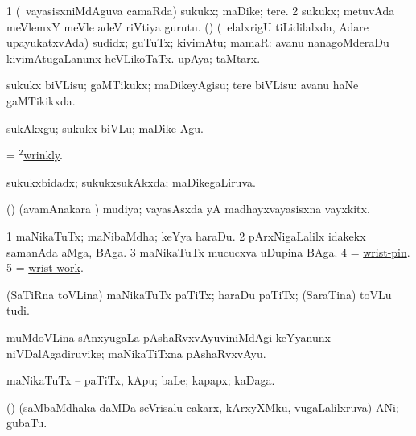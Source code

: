 \begin{center}
\bentry
{} 
\gl{\nA}
\expl{}
\bmng
\bnum
\num{1} (\sA\ vayasisxniMdAguva camaRda) sukukx; maDike; tere. 
\num{2} sukukx; metuvAda meVlemxY meVle adeV riVtiya gurutu. 
 (\AmA) 
\banum
{} (\sA\ elalxrigU tiLidilalxda, Adare upayukatxvAda) sudidx; guTuTx; kivimAtu; mamaR:  avanu nanagoMderaDu kivimAtugaLanunx heVLikoTaTx. 
 upAya; taMtarx. 
\eanum
\numie
\enum
\emng
\eentry

\bentry
{} 
\gl{\sakirx}
\expl{}
\bmng
sukukx biVLisu; gaMTikukx; maDikeyAgisu; tere biVLisu:  avanu haNe gaMTikikxda. 
\emng

\noindent
\gl{\akirx}
\expl{}
\bmng
sukAkxgu; sukukx biVLu; maDike Agu. 
\emng
\eentry

\bentry
{} 
\gl{\nA}
\expl{}
\bmng
= \hyperlink{wrinkly(2)}{$^2$wrinkly}. 
\emng
\eentry

\bentry 
{} 
\gl{\gu}
\bmng
sukukxbidadx; sukukxsukAkxda; maDikegaLiruva. 
\emng
\eentry

\bentry 
{} 
\gl{\nA}
\bmng
(\ashi) (avamAnakara \parx) mudiya; vayasAsxda yA madhayxvayasisxna vayxkitx. 
\emng
\eentry

\bentry
{} 
\gl{\nA}
\expl{}
\bmng
\bnum
\num{1} maNikaTuTx; maNibaMdha; keYya haraDu. 
\num{2} pArxNigaLalilx idakekx samanAda aMga, BAga. 
\num{3} maNikaTuTx mucucxva uDupina BAga. 
\num{4} = \hyperlink{wrist-pin}{wrist-pin}. 
\num{5} = \hyperlink{wrist-work}{wrist-work}. 
\enum
\emng
\eentry

\bentry
{} 
\gl{\nA}
\expl{}
\bmng
(SaTiRna toVLina) maNikaTuTx paTiTx; haraDu paTiTx; (SaraTina) toVLu tudi. 
\emng
\eentry

\bentry
{} 
\gl{\nA}
\expl{}
\bmng
muMdoVLina sAnxyugaLa pAshaRvxvAyuviniMdAgi keYyanunx niVDalAgadiruvike; maNikaTiTxna pAshaRvxvAyu. 
\emng
\eentry

\bentry
{} 
\gl{\nA}
\expl{}
\bmng
maNikaTuTx -- paTiTx, kApu; baLe; kapapx; kaDaga. 
\emng
\eentry

\bentry
{} 
\gl{\nA}
\expl{}
\bmng
(\yaMshA) (saMbaMdhaka daMDa seVrisalu cakarx, kArxyXMku, \mo vugaLalilxruva) ANi; gubaTu. 
\emng
\eentry


\end{center}
